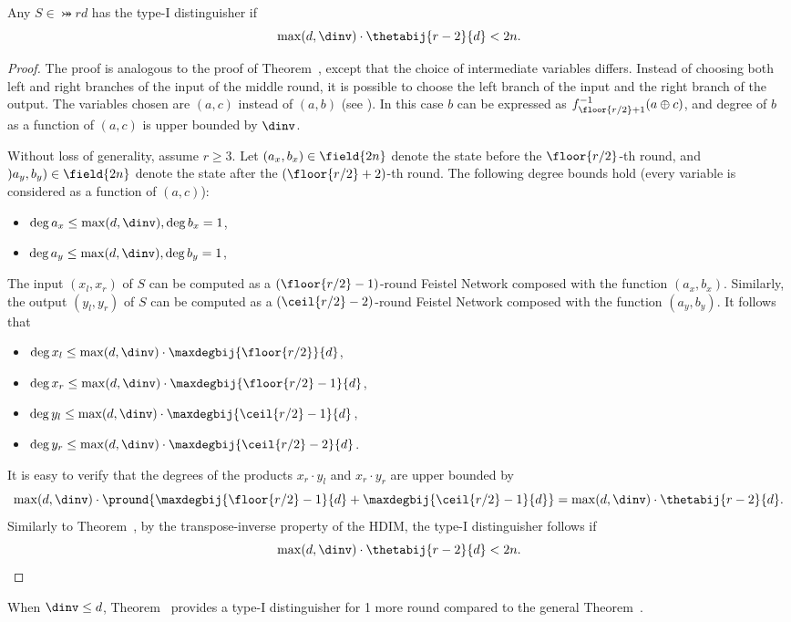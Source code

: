 \begin{theorem}
Any $S \in \bij{r}{d}$ has the type-I distinguisher if
$$
    \max(d,\dinv)\cdot \thetabij{r-2}{d} < 2n.
$$
\end{theorem}
\begin{proof}
The proof is analogous to the proof of Theorem~, except that the choice of intermediate variables differs.
Instead of choosing both left and right branches of the input of the middle round, it is possible to choose the left branch of the input and the right branch of the output. The variables chosen are $(a,c)$ instead of $(a,b)$ (see ). In this case $b$ can be expressed as $f_{\floor{r/2}+1}^{-1}(a \oplus c)$, and degree of $b$ as a function of $(a,c)$ is upper bounded by $\dinv$.

Without loss of generality, assume $r \ge 3$. Let $(a_x, b_x) \in \field{2n}$ denote the state before the $\floor{r/2}$-th round, and $)a_y, b_y) \in \field{2n}$ denote the state after the $(\floor{r/2}+2)$-th round. The following degree bounds hold (every variable is considered as a function of $(a,c)$):
\begin{itemize}
    \item $\deg{a_x} \le \max(d,\dinv), \deg{b_x} = 1$,
    \item $\deg{a_y} \le \max(d,\dinv), \deg{b_y} = 1$,
\end{itemize}
The input $(x_l, x_r)$ of $S$ can be computed as a $(\floor{r/2}-1)$-round Feistel Network composed with the function $(a_x, b_x)$. Similarly, the output $(y_l, y_r)$ of $S$ can be computed as a $(\ceil{r/2}-2)$-round Feistel Network composed with the function $(a_y, b_y)$. It follows that
\begin{itemize}
    \item $\deg{x_l} \le \max(d,\dinv)\cdot \maxdegbij{\floor{r/2}}{d}$,
    \item $\deg{x_r} \le \max(d,\dinv)\cdot \maxdegbij{\floor{r/2}-1}{d}$,
    \item $\deg{y_l} \le \max(d,\dinv)\cdot \maxdegbij{\ceil{r/2}-1}{d}$, 
    \item $\deg{y_r} \le \max(d,\dinv)\cdot \maxdegbij{\ceil{r/2}-2}{d}$.
\end{itemize}
It is easy to verify that the degrees of the products $x_r\cdot y_l$ and $x_r \cdot y_r$ are upper bounded by $$
\max(d,\dinv)\cdot\pround{\maxdegbij{\floor{r/2}-1}{d} + \maxdegbij{\ceil{r/2}-1}{d}} = \max(d,\dinv)\cdot\thetabij{r-2}{d}.$$
Similarly to Theorem~, by the transpose-inverse property of the HDIM, the type-I distinguisher follows if
$$\max(d,\dinv)\cdot\thetabij{r-2}{d} < 2n.$$
\end{proof}
\begin{remark}
When $\dinv \le d$, Theorem~ provides a type-I distinguisher for 1 more round compared to the general Theorem~.
\end{remark}

